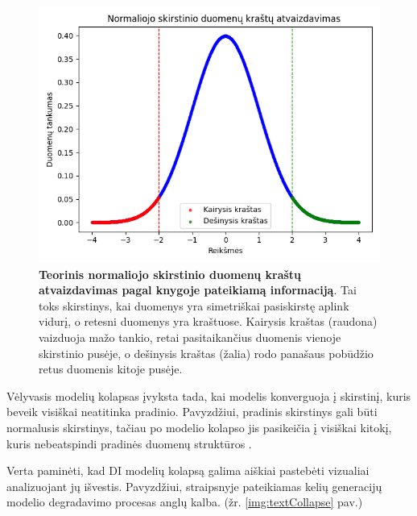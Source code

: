 \documentclass{VUMIFInfKursinis}
\begin{document}
\begin{figure}[H]
    \centering
    \includegraphics[scale=0.6]{img/normaliojo_skirstinio_grafikas.png}
    \caption{\textbf{Teorinis normaliojo skirstinio duomenų kraštų atvaizdavimas pagal \cite{Statistika} knygoje pateikiamą informaciją}. Tai toks skirstinys, kai duomenys yra simetriškai pasiskirstę aplink vidurį, o retesni duomenys yra kraštuose. \textcolor{raudona}{Kairysis kraštas (raudona)} vaizduoja mažo tankio, retai pasitaikančius duomenis vienoje skirstinio pusėje, o \textcolor{zalia}{dešinysis kraštas (žalia)} rodo panašaus pobūdžio retus duomenis kitoje pusėje.}  
    \label{img:uodegos}
\end{figure}


Vėlyvasis modelių kolapsas įvyksta tada, kai modelis konverguoja į skirstinį, kuris beveik visiškai neatitinka pradinio. Pavyzdžiui, pradinis skirstinys gali būti normalusis skirstinys, tačiau po modelio kolapso jis pasikeičia į visiškai kitokį, kuris nebeatspindi pradinės duomenų struktūros .


Verta paminėti, kad DI modelių kolapsą galima aiškiai pastebėti vizualiai analizuojant jų išvestis. Pavyzdžiui, straipsnyje \cite{AICollapseNature} pateikiamas kelių generacijų modelio degradavimo procesas anglų kalba. (žr. \ref{img:textCollapse} pav.)
\end{document}
